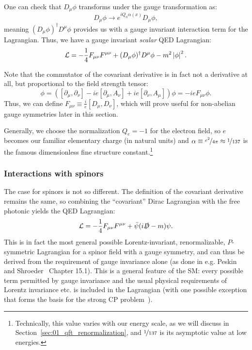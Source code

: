 One can check that $D_\mu\phi$ transforms under the gauge transformation as:
\begin{equation}
	\label{eq:01_qft_gt_maxwell_covariant_derivative_gauge}
	D_\mu\phi \rightarrow e^{iQ_\phi\alpha(x)}D_\mu\phi,
\end{equation}
meaning $(D_\mu\phi)^\dagger D^\mu\phi$ provides us with a gauge invariant interaction term for the Lagrangian.
Thus, we have a gauge invariant \textit{scalar} QED Lagrangian:
\begin{equation}
	\label{eq:01_qft_gt_maxwell_scalar_lagrangian}
	\mathcal L = -\frac{1}{4}F_{\mu\nu}F^{\mu\nu} + (D_\mu\phi)^\dagger D^\mu\phi - m^2\left\lvert \phi \right\rvert^2.
\end{equation}

Note that the commutator of the covariant derivative is in fact not a derivative at all, but proportional to the field strength tensor:
\begin{equation}
	[D_\mu, D_\nu]\phi = ([\partial_\mu, \partial_\nu] - ie[\partial_\mu, A_\nu] + ie[\partial_\nu, A_\mu])\phi = -ieF_{\mu\nu}\phi.
\end{equation}
Thus, we can define $F_{\mu\nu} \equiv \frac{i}{e}[D_\mu, D_\nu]$, which will prove useful for non-abelian gauge symmetries later in this section.

Generally, we choose the normalization $Q_e = -1$ for the electron field, so $e$ becomes our familiar elementary charge (in natural units) and $\alpha\equiv\cnicefrac{e^2}{4\pi} \approx \cnicefrac{1}{137}$ is the famous dimensionless fine structure constant.\footnote{Technically, this value varies with our energy scale, as we will discuss in Section~\ref{sec:01_qft_renormalization}, and $\cnicefrac{1}{137}$ is its asymptotic value at low energies.}

\subsubsection{Interactions with spinors}

The case for spinors is not so different.
The definition of the covariant derivative remains the same, so combining the ``covariant'' Dirac Lagrangian with the free photonic yields the QED Lagrangian:
\begin{equation}
	\label{eq:01_qft_gt_maxwell_qed_lagrangian}
	\mathcal L = -\frac{1}{4}F_{\mu\nu}F^{\mu\nu} + \bar\psi(i\cslashed D - m)\psi.
\end{equation}
This is in fact the most general possible Lorentz-invariant, renormalizable, $P$-symmetric Lagrangian for a spinor field with a \UU[1] gauge symmetry, and can thus be derived from the requirement of gauge invariance alone (as done in e.g. Peskin and Shroeder~\cite{Peskin:1995ev} Chapter 15.1).
This is a general feature of the SM: every possible term permitted by gauge invariance and the usual physical requirements of Lorentz invariance etc. is included in the Lagrangian (with one possible exception that forms the basis for the strong CP problem~\cite{Wu:1991rw,Mannel:2007zz}).

